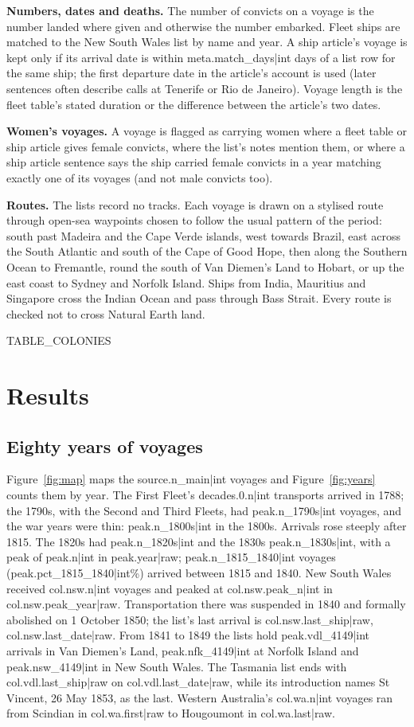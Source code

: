 \documentclass[11pt,a4paper]{article}
\begin{document}
\textbf{Numbers, dates and deaths.} The number of convicts on a voyage is the number landed where given and otherwise the number embarked. Fleet ships are matched to the New South Wales list by name and year. A ship article's voyage is kept only if its arrival date is within {{meta.match_days|int}} days of a list row for the same ship; the first departure date in the article's account is used (later sentences often describe calls at Tenerife or Rio de Janeiro). Voyage length is the fleet table's stated duration or the difference between the article's two dates.

\textbf{Women's voyages.} A voyage is flagged as carrying women where a fleet table or ship article gives female convicts, where the list's notes mention them, or where a ship article sentence says the ship carried female convicts in a year matching exactly one of its voyages (and not male convicts too).

\textbf{Routes.} The lists record no tracks. Each voyage is drawn on a stylised route through open-sea waypoints chosen to follow the usual pattern of the period: south past Madeira and the Cape Verde islands, west towards Brazil, east across the South Atlantic and south of the Cape of Good Hope, then along the Southern Ocean to Fremantle, round the south of Van Diemen's Land to Hobart, or up the east coast to Sydney and Norfolk Island. Ships from India, Mauritius and Singapore cross the Indian Ocean and pass through Bass Strait. Every route is checked not to cross Natural Earth land.

{{TABLE_COLONIES}}

\section{Results}
\subsection{Eighty years of voyages}
Figure~\ref{fig:map} maps the {{source.n_main|int}} voyages and Figure~\ref{fig:years} counts them by year. The First Fleet's {{decades.0.n|int}} transports arrived in 1788; the 1790s, with the Second and Third Fleets, had {{peak.n_1790s|int}} voyages, and the war years were thin: {{peak.n_1800s|int}} in the 1800s. Arrivals rose steeply after 1815. The 1820s had {{peak.n_1820s|int}} and the 1830s {{peak.n_1830s|int}}, with a peak of {{peak.n|int}} in {{peak.year|raw}}; {{peak.n_1815_1840|int}} voyages ({{peak.pct_1815_1840|int}}\%) arrived between 1815 and 1840. New South Wales received {{col.nsw.n|int}} voyages and peaked at {{col.nsw.peak_n|int}} in {{col.nsw.peak_year|raw}}. Transportation there was suspended in 1840 and formally abolished on 1 October 1850; the list's last arrival is {{col.nsw.last_ship|raw}}, {{col.nsw.last_date|raw}}. From 1841 to 1849 the lists hold {{peak.vdl_4149|int}} arrivals in Van Diemen's Land, {{peak.nfk_4149|int}} at Norfolk Island and {{peak.nsw_4149|int}} in New South Wales. The Tasmania list ends with {{col.vdl.last_ship|raw}} on {{col.vdl.last_date|raw}}, while its introduction names St Vincent, 26 May 1853, as the last. Western Australia's {{col.wa.n|int}} voyages ran from Scindian in {{col.wa.first|raw}} to Hougoumont in {{col.wa.last|raw}}.
\end{document}
